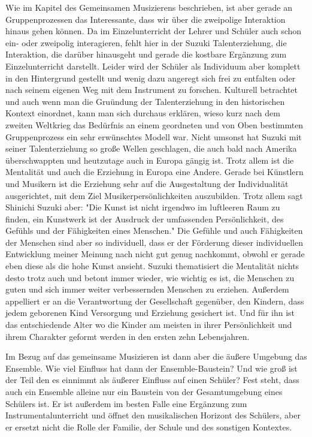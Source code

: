 Wie im Kapitel des Gemeinsamen Musizierens beschrieben, ist aber gerade an
Gruppenprozessen das Interessante, dass wir über die zweipolige Interaktion
hinaus gehen können. Da im Einzelunterricht der Lehrer und Schüler auch schon
ein- oder zweipolig interagieren, fehlt hier in der Suzuki Talenterziehung, die
Interaktion, die darüber hinausgeht und gerade die kostbare Ergänzung zum
Einzelunterricht darstellt.
Leider wird der Schüler als Individuum aber komplett in den Hintergrund gestellt
und wenig dazu angeregt sich frei zu entfalten oder nach seinem eigenen Weg mit
dem Instrument zu forschen. Kulturell betrachtet und auch wenn man die Gruündung
der Talenterziehung in den historischen Kontext einordnet, kann man sich
durchaus erklären, wieso kurz nach dem zweiten Weltkrieg das Bedürfnis an einem
geordneten und von Oben bestimmten Gruppenprozess ein sehr erwünschtes Modell
war. Nicht umsonst hat Suzuki mit seiner Talenterziehung so große Wellen
geschlagen, die auch bald nach Amerika überschwappten und heutzutage auch in
Europa gängig ist. Trotz allem ist die Mentalität und auch die Erziehung in
Europa eine Andere. Gerade bei Künstlern und Musikern ist die Erziehung sehr auf die Ausgestaltung der
Individualität ausgerichtet, mit dem Ziel Musikerpersönlichkeiten
auszubilden. Trotz allem sagt Shinichi Suzuki aber: "Die Kunst ist nicht irgendwo im luftleeren Raum zu finden, ein
Kunstwerk ist der
Ausdruck der umfassenden Persönlichkeit, des Gefühls und der Fähigkeiten eines
Menschen." \autocite[103]{suzuki:erziehung_ist_liebe} Die Gefühle und auch
Fähigkeiten der Menschen sind aber so individuell, dass er der Förderung dieser
individuellen Entwicklung meiner Meinung nach nicht gut genug nachkommt, obwohl
er gerade eben diese als die hohe Kunst ansieht.
Suzuki thematisiert die Mentalität nichts desto trotz auch und betont immer
wieder, wie wichtig es ist, die Menschen zu guten und sich immer weiter
verbessernden Menschen zu erziehen. Außerdem appelliert er an die Verantwortung
der Gesellschaft gegenüber, den Kindern, dass jedem geborenen Kind Versorgung
und Erziehung gesichert ist. \autocite[130]{suzuki:erziehung_ist_liebe}
Und für ihn ist das entschiedende Alter wo die Kinder am meisten in ihrer
Persönlichkeit und ihrem Charakter geformt werden
in den ersten zehn Lebensjahren. 


Im Bezug auf das gemeinsame Musizieren ist dann aber die äußere Umgebung das
Ensemble. Wie viel Einfluss hat dann der Ensemble-Baustein? Und wie groß ist der
Teil den es einnimmt als äußerer Einfluss auf einen Schüler? Fest steht, dass
auch ein Ensemble alleine nur ein Baustein von der Gesamtumgebung eines Schülers
ist. Er ist außerdem im besten Falle eine Ergänzung zum Instrumentalunterricht
und öffnet den musikalischen Horizont des Schülers, aber er ersetzt nicht die
Rolle der Familie, der Schule und des sonstigen Kontextes. 






